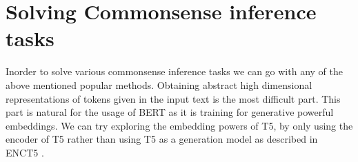\section{Solving Commonsense inference tasks}
Inorder to solve various commonsense inference tasks we can go with any of the above mentioned popular methods. Obtaining abstract high dimensional representations of tokens given in the input text is the most difficult part. This part is natural for the usage of BERT as it is training for generative powerful embeddings. We can try exploring the embedding powers of T5, by only using the encoder of T5 rather than using T5 as a generation model as described in ENCT5 \cite{EncT5Intro}.


